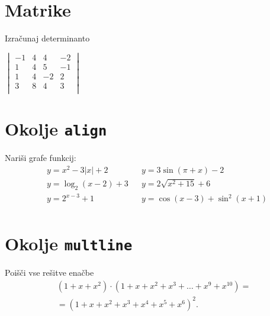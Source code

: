 \documentclass[a4paper,12pt]{article}
\begin{document}
\section*{Matrike}
Izračunaj determinanto

\begin{center}
$\begin{vmatrix} 
    -1 & 4 & 4 & -2 \\
    1 & 4 & 5 & -1 \\
    1 & 4 & -2 & 2 \\
    3 & 8 & 4 & 3 \\
\end{vmatrix}$
\end{center}

\section*{Okolje \texttt{align}}
Nariši grafe funkcij:
\begin{align*}
& y = x^2 - 3|x| + 2   && y = 3 \sin(\pi+x) - 2 \\
& y = \log_2(x-2) + 3  && y = 2 \sqrt{x^2+15} + 6 \\
& y = 2^{x-3} + 1      && y = \cos(x-3) + \sin^2(x+1) \\
\end{align*}

\section*{Okolje \texttt{multline}}
Poišči vse rešitve enačbe
\begin{multline*}
(1+x+x^2) \cdot (1+x+x^2+x^3+\ldots+x^9+x^{10}) = \\
=(1+x+x^2+x^3+x^4+x^5+x^6)^2. 
\end{multline*}
\end{document}

